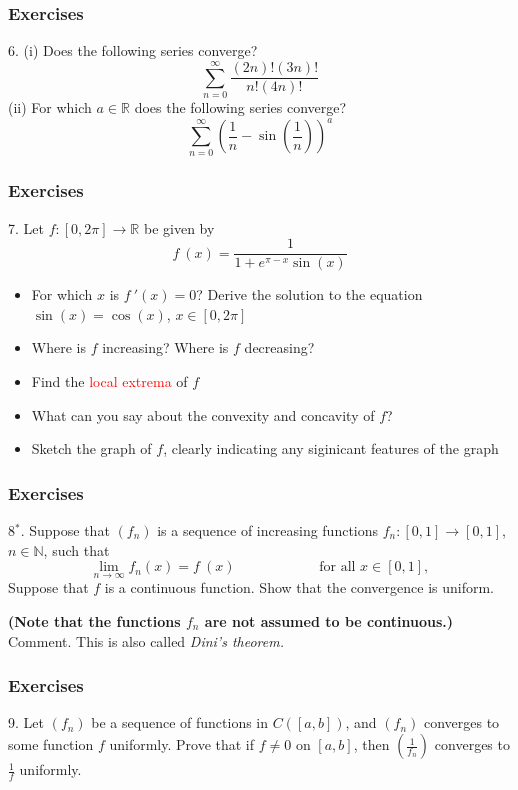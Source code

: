 \documentclass{beamer}
\newcommand{\myfont}{\rmfamily\normalsize\upshape\mdseries}
\newcommand{\R}{\mathbb{R}}
\begin{document}
\begin{frame}
    \frametitle{Exercises}
    \hspace{1em}
    6. (i) Does the following series converge?
    $$\sum_{n=0}^\infty \frac{(2n)!(3n)!}{n!(4n)!}$$
    \pause
    \hspace{2em}   
    (ii) For which $a \in \R$ does the following series converge?
    $$\sum_{n=0}^\infty (\frac{1}{n}-\sin(\frac{1}{n}))^a$$
\end{frame}
\begin{frame}
    \frametitle{Exercises}
    \hspace{1em} 7. Let $f: [0,2\pi ] \to \R$ be given by  
    $$f~(x)=\frac{1}{1+e^{\pi-x }\sin (x)}$$
    \vspace{1em}
    \begin{itemize}
        \item[(i)] For which $x$ is $f~'(x)=0$? Derive the solution to the equation $\sin(x)=\cos(x)$, $x \in [0,2\pi]$
        \item[(ii)] Where is $f $ increasing? Where is $f $ decreasing?
        \item[(iii)] Find the \textcolor{red}{local extrema} of $f$ 
        \item[(iv)] What can you say about the convexity and concavity of $f$?
        \item[(v)] Sketch the graph of $f$, clearly indicating any siginicant features of the graph  
    \end{itemize}
\end{frame}
\begin{frame}
    \frametitle{Exercises}
    \hspace{1em}
    8$^*$. Suppose that $(f_n)$ is a sequence of increasing functions
    $f_n: [0,1] \to [0,1]$, $n \in \mathbb{N}$, such that 
    $$\underset{n\to \infty}{\lim} f_n(x) =f~(x) \text{ ~~~~~~~~~~~~~~~~ for all } x \in [0,1],$$
    Suppose that $f$ is a continuous function. Show that the convergence is uniform.
    \par \textbf{(Note that the functions $f_n$ are not assumed to be continuous.)}
    \\ \vspace{2em}
    Comment. This is also called \itshape Dini's theorem.\myfont
\end{frame}
\begin{frame}
    \frametitle{Exercises}
    \hspace{1em}
    9. Let $(f_n)$ be a sequence of functions in $C([a,b])$, 
    and $(f_n)$ converges to some function $f$ uniformly. 
    Prove that if $f\neq 0$ on $[a,b]$, then $(\frac{1}{f_n} )$ converges to $\frac{1}{f}$ uniformly.
\end{frame}
\end{document}
